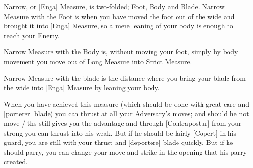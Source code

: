 Narrow, or [Enga] Measure, is two-folded;
Foot, Body and Blade. Narrow Measure with the Foot is when you have
moved the foot out of the wide and brought it into [Enga] Measure, so
a mere leaning of your body is enough to reach your Enemy.

Narrow Measure with the Body is, without moving your foot, simply by
body movement you move out of Long Measure into Strict Measure.

Narrow Measure with the blade is the distance where you bring your
blade from the wide into [Enga] Measure by leaning your body.


When you have achieved this measure  (which should be done with great
care and [porterer] blade) you can thrust at all your Adversary's
moves; and should he not move / ths still gives you the advantage  and
through [Contrapostur] from your strong you can thrust into his
weak. But if he should be fairly [Copert] in his guard, you are still
with your thrust and [deportere] blade quickly. But if he should
parry, you can change your move and strike in the opening that his
parry created.



